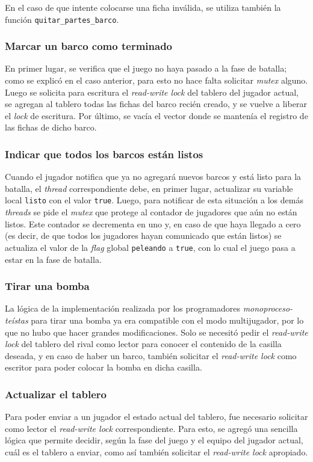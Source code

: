 \documentclass[a4paper]{article}
\begin{document}
En el caso de que intente colocarse una ficha inválida, se utiliza también la
función \texttt{quitar\_partes\_barco}.


\subsubsection*{Marcar un barco como terminado}

En primer lugar, se verifica que el juego no haya pasado a la fase de batalla;
como se explicó en el caso anterior, para esto no hace falta solicitar
\emph{mutex} alguno. Luego se solicita para escritura el \emph{read-write
lock} del tablero del jugador actual, se agregan al tablero todas las fichas
del barco recién creado, y se vuelve a liberar el \emph{lock} de escritura.
Por último, se vacía el vector donde se mantenía el registro de las fichas de
dicho barco.

\subsubsection*{Indicar que todos los barcos están listos}
Cuando el jugador notifica que ya no agregará nuevos barcos y está listo para
la batalla, el \emph{thread} correspondiente debe, en primer lugar, actualizar
su variable local \texttt{listo} con el valor \texttt{true}. Luego, para
notificar de esta situación a los demás \emph{threads} se pide el
\emph{mutex} que protege al contador de jugadores que aún no están listos.
Este contador se decrementa en uno y, en caso de que haya llegado a cero (es
decir, de que todos los jugadores hayan comunicado que están listos) se
actualiza el valor de la \emph{flag} global \texttt{peleando} a \texttt{true},
con lo cual el juego pasa a estar en la fase de batalla.

\subsubsection*{Tirar una bomba}
La lógica de la implementación realizada por los programadores \emph
{monoproceso-teístas} para tirar una bomba ya era compatible con el modo
multijugador, por lo que no hubo que hacer grandes modificaciones. Solo se
necesitó pedir el \emph{read-write lock} del tablero del rival como lector
para conocer el contenido de la casilla deseada, y en caso de haber un barco,
también solicitar el \emph{read-write lock} como escritor para poder colocar
la bomba en dicha casilla.

\subsubsection*{Actualizar el tablero}
Para poder enviar a un jugador el estado actual del tablero, fue necesario
solicitar como lector el \emph{read-write lock} correspondiente. Para esto,
se agregó una sencilla lógica que permite decidir, según la fase del juego y
el equipo del jugador actual, cuál es el tablero a enviar, como así también
solicitar el \emph{read-write lock} apropiado.
\end{document}
